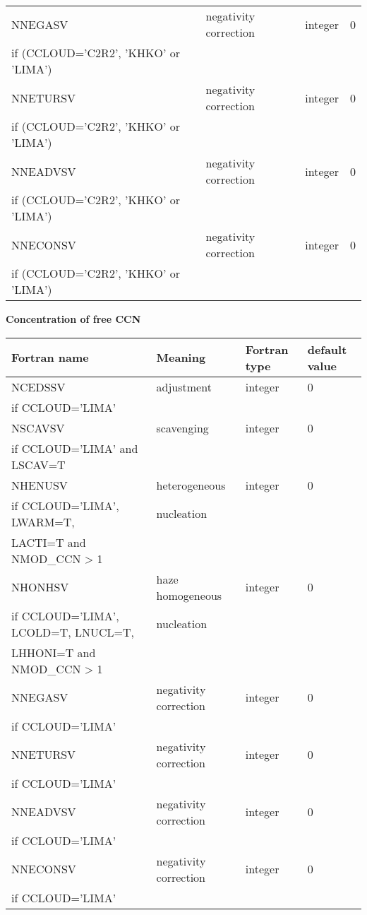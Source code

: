 \begin{longtable} {|p{}|p{}|>{\centering}p{}|p{}<{\centering}|}
NNEGASV   & negativity correction & integer  &  0 \\ \nopagebreak
if (CCLOUD='C2R2', 'KHKO' or 'LIMA') &&&\\\hline
NNETURSV  &negativity correction   & integer  &  0 \\ \nopagebreak
if (CCLOUD='C2R2', 'KHKO' or 'LIMA') &&&\\\hline
NNEADVSV  & negativity correction  & integer  &  0 \\ \nopagebreak
if (CCLOUD='C2R2', 'KHKO' or 'LIMA') &&&\\\hline
NNECONSV  &negativity correction    & integer  &  0 \\ \nopagebreak
if (CCLOUD='C2R2', 'KHKO' or 'LIMA') &&&\\\hline
\end{longtable}

\textbf{Concentration of free CCN}
\begin{longtable} {|p{}|p{}|>{\centering}p{}|p{}<{\centering}|}
\hline
Fortran name & Meaning & Fortran type & default value \\
\hline \hline
\endhead
NCEDSSV & adjustment & integer & 0 \\ \nopagebreak
if CCLOUD='LIMA' &&& \\\hline

NSCAVSV & scavenging & integer & 0 \\ \nopagebreak
if CCLOUD='LIMA' and LSCAV=T &&& \\\hline

NHENUSV & heterogeneous  & integer & 0 \\ \nopagebreak
if CCLOUD='LIMA', LWARM=T, &nucleation && \\ \nopagebreak
LACTI=T and NMOD\_CCN > 1 &&& \\\hline

NHONHSV & haze homogeneous  & integer & 0 \\ \nopagebreak
if CCLOUD='LIMA', LCOLD=T, LNUCL=T, & nucleation&& \\ \nopagebreak
LHHONI=T and NMOD\_CCN > 1 &&& \\\hline

NNEGASV   & negativity correction & integer  &  0 \\ \nopagebreak
if CCLOUD='LIMA' &&&\\\hline
NNETURSV  &negativity correction   & integer  &  0 \\ \nopagebreak
if CCLOUD='LIMA' &&&\\\hline
NNEADVSV  & negativity correction  & integer  &  0 \\ \nopagebreak
if CCLOUD='LIMA' &&&\\\hline
NNECONSV  &negativity correction    & integer  &  0 \\ \nopagebreak
if CCLOUD='LIMA' &&&\\\hline
\end{longtable}

